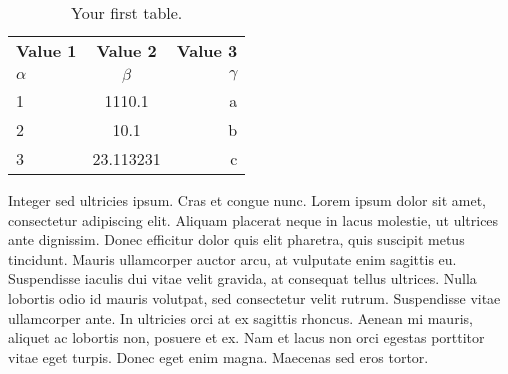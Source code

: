 \documentclass[man]{apa7}
\begin{document}
\begin{table}
	\begin{center}
		\caption{Your first table.}
		\label{tab:table1}
		\begin{tabular}{l|c|r} %
			\textbf{Value 1} & \textbf{Value 2} & \textbf{Value 3}\\
			$\alpha$ & $\beta$ & $\gamma$ \\
			\hline
			1 & 1110.1 & a\\
			2 & 10.1 & b\\
			3 & 23.113231 & c\\
		\end{tabular}
	\end{center}
\end{table}

Integer sed ultricies ipsum. Cras et congue nunc. Lorem ipsum dolor sit amet, consectetur adipiscing elit. Aliquam placerat neque in lacus molestie, ut ultrices ante dignissim. Donec efficitur dolor quis elit pharetra, quis suscipit metus tincidunt. Mauris ullamcorper auctor arcu, at vulputate enim sagittis eu. Suspendisse iaculis dui vitae velit gravida, at consequat tellus ultrices. Nulla lobortis odio id mauris volutpat, sed consectetur velit rutrum. Suspendisse vitae ullamcorper ante. In ultricies orci at ex sagittis rhoncus. Aenean mi mauris, aliquet ac lobortis non, posuere et ex. Nam et lacus non orci egestas porttitor vitae eget turpis. Donec eget enim magna. Maecenas sed eros tortor.

\begingroup
\parindent 0pt
\def\enotesize{\normalsize}
\theendnotes
\endgroup

\printbibliography
\end{document}
